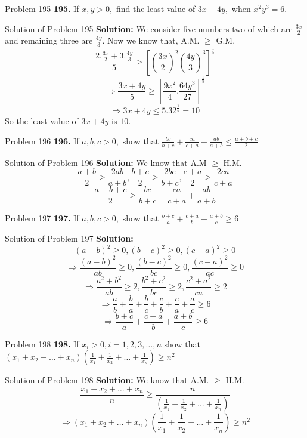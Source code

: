\documentclass[aspectratio=1610,8pt]{beamer}
\begin{document}
\begin{frame}{Problem 195}
  \textbf{195.} If $x, y > 0,$ find the least value of $3x + 4y,$ when $x^2y^3 = 6.$
\end{frame}
\begin{frame}{Solution of Problem 195}
  \textbf{Solution:} We consider five numbers two of which are $\frac{3x}{2}$ and remaining three are $\frac{4y}{3}.$ Now we know
  that, A.M. $\geq$ G.M.
  $$\frac{2.\frac{3x}{2} + 3.\frac{4y}{3}}{5}\geq
  \left[\left(\frac{3x}{2}\right)^2\left(\frac{4y}{3}\right)^3\right]^{\frac{1}{5}}$$
  $$\Rightarrow \frac{3x + 4y}{5}\geq \left[\frac{9x^2}{4}.\frac{64y^3}{27}\right]^{\frac{1}{5}}$$
  $$\Rightarrow 3x + 4y \leq 5.{32}^{\frac{1}{5}} = 10$$
  So the least value of $3x + 4y$ is $10.$
\end{frame}
\begin{frame}{Problem 196}
  \textbf{196.} If $a, b, c > 0,$ show that $\frac{bc}{b + c} + \frac{ca}{c + a} + \frac{ab}{a + b}\leq \frac{a + b + c}{2}$
\end{frame}
\begin{frame}{Solution of Problem 196}
  \textbf{Solution:} We know that A.M $\geq$ H.M.
  $$\frac{a + b}{2}\geq \frac{2ab}{a + b}, \frac{b + c}{2}\geq \frac{2bc}{b + c}, \frac{c + a}{2}\geq \frac{2ca}{c + a}$$
  $$\frac{a + b + c}{2}\geq \frac{bc}{b + c} + \frac{ca}{c + a} + \frac{ab}{a + b}$$
\end{frame}
\begin{frame}{Problem 197}
  \textbf{197.} If $a, b, c > 0,$ show that $\frac{b + c}{a} + \frac{c + a}{b} + \frac{a + b}{c}\geq 6$
\end{frame}
\begin{frame}{Solution of Problem 197}
  \textbf{Solution:} $$(a - b)^2 \geq 0, (b - c)^2\geq 0, (c - a)^2\geq 0$$
  $$\Rightarrow \frac{(a - b)^2}{ab}\geq 0, \frac{(b - c)^2}{bc}\geq 0, \frac{(c - a)^2}{ac}\geq 0$$
  $$\Rightarrow \frac{a^2 + b^2}{ab}\geq 2, \frac{b^2 + c^2}{bc}\geq 2, \frac{c^2 + a^2}{ca}\geq 2$$
  $$\Rightarrow \frac{a}{b} + \frac{b}{a} + \frac{b}{c} + \frac{c}{b} + \frac{c}{a} + \frac{a}{c}\geq 6$$
  $$\Rightarrow \frac{b + c}{a} + \frac{c + a}{b} + \frac{a + b}{c}\geq 6$$
\end{frame}
\begin{frame}{Problem 198}
  \textbf{198.} If $x_i > 0, i = 1, 2, 3, \ldots, n$ show that $(x_1 + x_2 + \ldots + x_n)\left(\frac{1}{x_1} + \frac{1}{x_2} +
  \ldots + \frac{1}{x_n}\right) \geq n^2$
\end{frame}
\begin{frame}{Solution of Problem 198}
  \textbf{Solution:} We know that A.M. $\geq$ H.M.
  $$\frac{x_1 + x_2 + \ldots + x_n}{n}\geq \frac{n}{\left(\frac{1}{x_1} + \frac{1}{x_2} + \ldots + \frac{1}{x_n}\right)}$$
  $$\Rightarrow (x_1 + x_2 + \ldots + x_n)\left(\frac{1}{x_1} + \frac{1}{x_2} +
  \ldots + \frac{1}{x_n}\right) \geq n^2$$
\end{frame}
\end{document}

